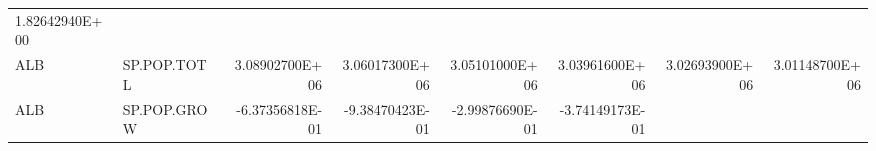 \documentclass[]{article}
\begin{document}
\begin{longtable}[]{@{}llrrrrrr@{}}
\begin{minipage}[t]{0.11\columnwidth}
1.82642940E+00\strut
\end{minipage}\tabularnewline
\begin{minipage}[t]{0.06\columnwidth}\raggedright\strut
ALB\strut
\end{minipage} & \begin{minipage}[t]{0.08\columnwidth}\raggedright\strut
SP.POP.TOTL\strut
\end{minipage} & \begin{minipage}[t]{0.11\columnwidth}\raggedleft\strut
3.08902700E+06\strut
\end{minipage} & \begin{minipage}[t]{0.11\columnwidth}\raggedleft\strut
3.06017300E+06\strut
\end{minipage} & \begin{minipage}[t]{0.11\columnwidth}\raggedleft\strut
3.05101000E+06\strut
\end{minipage} & \begin{minipage}[t]{0.11\columnwidth}\raggedleft\strut
3.03961600E+06\strut
\end{minipage} & \begin{minipage}[t]{0.11\columnwidth}\raggedleft\strut
3.02693900E+06\strut
\end{minipage} & \begin{minipage}[t]{0.11\columnwidth}\raggedleft\strut
3.01148700E+06\strut
\end{minipage}\tabularnewline
\begin{minipage}[t]{0.06\columnwidth}\raggedright\strut
ALB\strut
\end{minipage} & \begin{minipage}[t]{0.08\columnwidth}\raggedright\strut
SP.POP.GROW\strut
\end{minipage} & \begin{minipage}[t]{0.11\columnwidth}\raggedleft\strut
-6.37356818E-01\strut
\end{minipage} & \begin{minipage}[t]{0.11\columnwidth}\raggedleft\strut
-9.38470423E-01\strut
\end{minipage} & \begin{minipage}[t]{0.11\columnwidth}\raggedleft\strut
-2.99876690E-01\strut
\end{minipage} & \begin{minipage}[t]{0.11\columnwidth}\raggedleft\strut
-3.74149173E-01\strut
\end{minipage} & \begin{minipage}[t]{0.11\columnwidth}\raggedleft\strut

\end{minipage}
\end{longtable}
\end{document}
